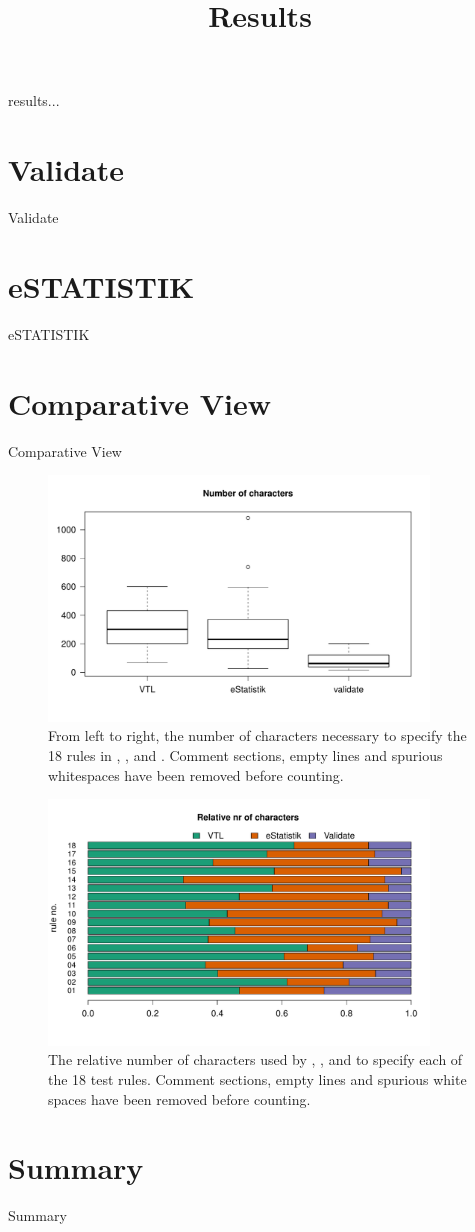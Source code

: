 \title{Results}

results...

\section{Validate}

Validate

\section{eSTATISTIK}

eSTATISTIK

\section{Comparative View}

Comparative View

\begin{figure}
\centering
\includegraphics[width=0.9\textwidth]{fig/boxplot.pdf}
\caption{From left to right, the number of characters necessary
to specify the 18 rules in , , and .
Comment sections, empty lines and spurious whitespaces have been removed before
counting. }
\end{figure}

\begin{figure}
\centering
\includegraphics[width=0.9\textwidth]{fig/barplot.pdf}
\caption{The relative number of characters used by ,
, and  to specify each of the 18 test rules.
Comment sections, empty lines and spurious white spaces have been removed
before counting. }
\end{figure}


\section{Summary}

Summary
